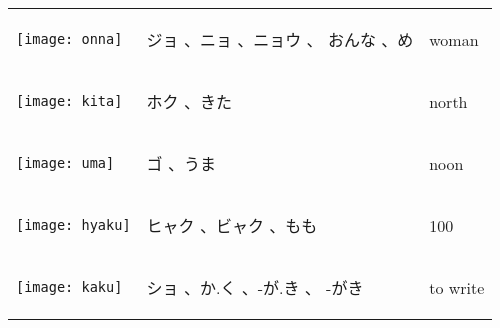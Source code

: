 \documentclass[a4paper,12pt]{extarticle}
\begin{document}
\begin{longtable}{|lp{6cm}p{4cm}|}
\\ 
\begin{minipage}{0.3\textwidth}
\centerline{
	\texttt{[image: onna]}
}
\end{minipage}
&
\begin{CJK}{UTF8}{min} ジョ 、ニョ 、ニョウ 、 おんな 、め\end{CJK}
&
 woman
\\ 
\begin{minipage}{0.3\textwidth}
\centerline{
	\texttt{[image: kita]}
}
\end{minipage}
&
\begin{CJK}{UTF8}{min} ホク 、きた\end{CJK}
&
 north
\\ 
\begin{minipage}{0.3\textwidth}
\centerline{
	\texttt{[image: uma]}
}
\end{minipage}
&
\begin{CJK}{UTF8}{min} ゴ 、うま\end{CJK}
&
 noon
\\ 
\begin{minipage}{0.3\textwidth}
\centerline{
	\texttt{[image: hyaku]}
}
\end{minipage}
&
\begin{CJK}{UTF8}{min} ヒャク 、ビャク 、もも\end{CJK}
&
 100
\\ 
\begin{minipage}{0.3\textwidth}
\centerline{
	\texttt{[image: kaku]}
}
\end{minipage}
&
\begin{CJK}{UTF8}{min} ショ 、か.く 、-が.き 、 -がき\end{CJK}
&
 to write

\end{longtable}
\end{document}
